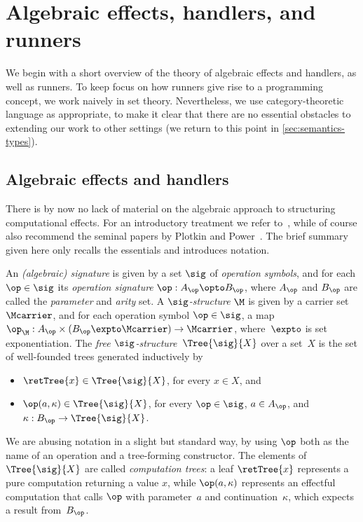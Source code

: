 
\section{Algebraic effects, handlers, and runners}
\label{sect:runnersbyexample}

We begin with a short overview of the theory of algebraic effects and handlers, as well as
runners. To keep focus on how runners give rise to a programming
concept, we work naively in set theory. Nevertheless, we use
category-theoretic language as appropriate, to make it clear that there are no essential
obstacles to extending our work to other settings (we return to this point in \cref{sec:semantics-types}).

\subsection{Algebraic effects and handlers}
\label{sect:algebraiceffects}

There is by now no lack of material on the algebraic approach to structuring computational effects.
For an introductory treatment we refer to~\cite{Bauer:WhatIsAlgebraic}, while of course
also recommend the seminal papers by Plotkin and
Power~\cite{Plotkin:SemanticsForAlgOperations,Plotkin:NotionsOfComputation}. The brief
summary given here only recalls the essentials and introduces notation.

An \emph{(algebraic) signature} is given by a set $\sig$ of \emph{operation symbols},
and for each $\op \in \sig$ its \emph{operation signature}
%
$
  \op : A_\op \opto B_\op
$,
%
where  $A_\op$ and $B_\op$ are called the \emph{parameter} and \emph{arity} set.
A \emph{$\sig$-structure} $\M$ is given by a carrier set $\Mcarrier$, and for each
operation symbol $\op \in \sig$, a map $\op_{\M} : A_\op \times (B_\op \expto \Mcarrier) \to \Mcarrier$,
where~$\expto$ is set exponentiation. The \emph{free $\sig$-structure~$\Tree{\sig}{X}$}
over a set~$X$ is the set of well-founded trees generated inductively by
%
\begin{itemize}
\item $\retTree{x} \in \Tree{\sig}{X}$, for every $x \in X$, and
\item $\op(a, \kappa) \in \Tree{\sig}{X}$, for every $\op \in \sig$, $a \in A_\op$, and $\kappa : B_\op \to \Tree{\sig}{X}$.
\end{itemize}
%
We are abusing notation in a slight but standard way, by using $\op$ both as the
name of an operation and a tree-forming constructor.
%
The elements of $\Tree{\sig}{X}$ are called \emph{computation trees}: a leaf
$\retTree{x}$ represents a pure computation returning a value $x$, while
$\op(a, \kappa)$ represents an effectful computation that calls $\op$ with
parameter~$a$ and continuation~$\kappa$, which expects a result from~$B_\op$.

